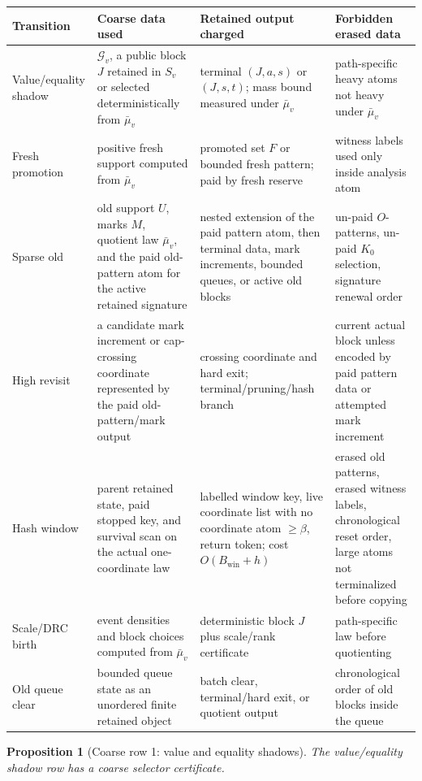 \documentclass[11pt]{article}
\newtheorem{proposition}[theorem]{Proposition}
\theoremstyle{remark}
\newcommand{\G}{\mathcal G}
\newcommand{\win}{\mathrm{win}}
\begin{document}
\begin{center}\small
\begin{tabular}{p{}p{}p{}p{}}
\toprule
Transition & Coarse data used & Retained output charged & Forbidden erased data \\
\midrule
Value/equality shadow & $\G_v$, a public block $J$ retained in $S_v$ or selected deterministically from $\bar\mu_v$ & terminal $(J,a,s)$ or $(J,s,t)$; mass bound measured under $\bar\mu_v$ & path-specific heavy atoms not heavy under $\bar\mu_v$ \\
Fresh promotion & positive fresh support computed from $\bar\mu_v$ & promoted set $F$ or bounded fresh pattern; paid by fresh reserve & witness labels used only inside analysis atom \\
Sparse old & old support $U$, marks $M$, quotient law $\bar\mu_v$, and the paid old-pattern atom for the active retained signature & nested extension of the paid pattern atom, then terminal data, mark increments, bounded queues, or active old blocks & un-paid $O$-patterns, un-paid $K_0$ selection, signature renewal order \\
High revisit & a candidate mark increment or cap-crossing coordinate represented by the paid old-pattern/mark output & crossing coordinate and hard exit; terminal/pruning/hash branch & current actual block unless encoded by paid pattern data or attempted mark increment \\
Hash window & parent retained state, paid stopped key, and survival scan on the actual one-coordinate law & labelled window key, live coordinate list with no coordinate atom $\ge\beta$, return token; cost $O(B_{\win}+h)$ & erased old patterns, erased witness labels, chronological reset order, large atoms not terminalized before copying \\
Scale/DRC birth & event densities and block choices computed from $\bar\mu_v$ & deterministic block $J$ plus scale/rank certificate & path-specific law before quotienting \\
Old queue clear & bounded queue state as an unordered finite retained object & batch clear, terminal/hard exit, or quotient output & chronological order of old blocks inside the queue \\
\bottomrule
\end{tabular}
\end{center}

\begin{proposition}[Coarse row 1: value and equality shadows]\label{prop:coarse-row-value}
The value/equality shadow row has a coarse selector certificate.
\end{proposition}
\end{document}
